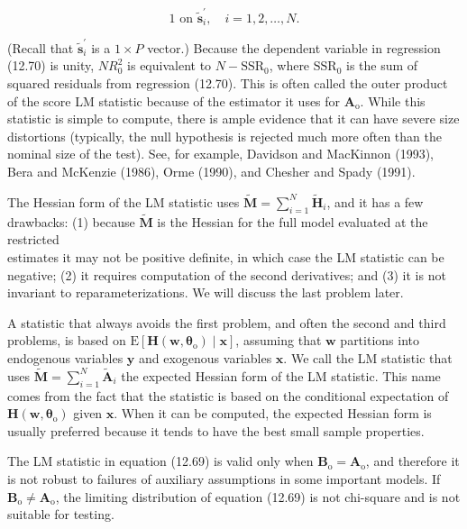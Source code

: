 \documentclass[10pt]{article}
\begin{document}
\begin{equation*}
1 \text { on } \tilde{\mathbf{s}}_{i}^{\prime}, \quad i=1,2, \ldots, N . \tag{12.70}
\end{equation*}


(Recall that $\tilde{\mathbf{s}}_{i}^{\prime}$ is a $1 \times P$ vector.) Because the dependent variable in regression (12.70) is unity, $N R_{0}^{2}$ is equivalent to $N-\mathrm{SSR}_{0}$, where $\mathrm{SSR}_{0}$ is the sum of squared residuals from regression (12.70). This is often called the outer product of the score LM statistic because of the estimator it uses for $\mathbf{A}_{\mathrm{o}}$. While this statistic is simple to compute, there is ample evidence that it can have severe size distortions (typically, the null hypothesis is rejected much more often than the nominal size of the test). See, for example, Davidson and MacKinnon (1993), Bera and McKenzie (1986), Orme (1990), and Chesher and Spady (1991).

The Hessian form of the LM statistic uses $\tilde{\mathbf{M}}=\sum_{i=1}^{N} \tilde{\mathbf{H}}_{i}$, and it has a few drawbacks: (1) because $\tilde{\mathbf{M}}$ is the Hessian for the full model evaluated at the restricted\\
estimates it may not be positive definite, in which case the LM statistic can be negative; (2) it requires computation of the second derivatives; and (3) it is not invariant to reparameterizations. We will discuss the last problem later.

A statistic that always avoids the first problem, and often the second and third problems, is based on $\mathrm{E}\left[\mathbf{H}\left(\mathbf{w}, \boldsymbol{\theta}_{\mathrm{o}}\right) \mid \mathbf{x}\right]$, assuming that $\mathbf{w}$ partitions into endogenous variables $\mathbf{y}$ and exogenous variables $\mathbf{x}$. We call the LM statistic that uses $\tilde{\mathbf{M}}= \sum_{i=1}^{N} \tilde{\mathbf{A}}_{i}$ the expected Hessian form of the LM statistic. This name comes from the fact that the statistic is based on the conditional expectation of $\mathbf{H}\left(\mathbf{w}, \boldsymbol{\theta}_{\mathrm{o}}\right)$ given $\mathbf{x}$. When it can be computed, the expected Hessian form is usually preferred because it tends to have the best small sample properties.

The LM statistic in equation (12.69) is valid only when $\mathbf{B}_{\mathrm{o}}=\mathbf{A}_{\mathrm{o}}$, and therefore it is not robust to failures of auxiliary assumptions in some important models. If $\mathbf{B}_{\mathrm{o}} \neq \mathbf{A}_{\mathrm{o}}$, the limiting distribution of equation (12.69) is not chi-square and is not suitable for testing.
\end{document}
